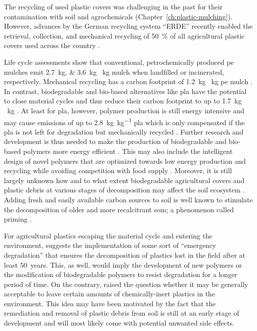 The recycling of used plastic covers was challenging in the past for their contamination with soil and agrochemicals (Chapter~\ref{ch:plastic-mulching}). However, advances by the German recycling system ``ERDE'' recently enabled the retrieval, collection, and mechanical recycling of \SI{50}{\percent} of all agricultural plastic covers used across the country \citep{BertlingKunststoffe2021,ERDERecyclingERDE2021}.

Life cycle assessments show that conventional, petrochemically produced \ac{pe} mulches emit \SIlist{2.7;3.6}{\kilo\gram}  \si{\per\kilo\gram} mulch when landfilled or incinerated, respectively. Mechanical recycling has a carbon footprint of \SI{1.2}{\kilo\gram}  \si{\per\kilo\gram} \ac{pe} mulch \citep{BosLife2008}. In contrast, biodegradable and bio-based alternatives like \ac{pla} have the potential to close material cycles and thus reduce their carbon footprint to up to \SI{1.7}{\kilo\gram}  \si{\per\kilo\gram} \citep{KollerSwitching2019,RezvaniGhomiLife2021}. At least for \ac{pla}, however, polymer production is still energy intensive and may cause  emissions of up to \SI{2.8}{\kilo\gram\per\kilo\gram} \ac{pla} which is only compensated if the \ac{pla} is not left for degradation but mechanically recycled \citep{RezvaniGhomiLife2021,AltmanMyth2021}. Further research and development is thus needed to make the production of biodegradable and bio-based polymers more energy efficient \citep{VieraAre2021}. This may also include the intelligent design of novel polymers that are optimized towards low energy production and recycling \citep{VieraAre2021,KorleyPolymer2021,KakadellisAchieving2021} while avoiding competition with food supply \citep{RhodesPlastic2018}. Moreover, it is still largely unknown how and to what extent biodegradable agricultural covers and plastic debris at various stages of decomposition may affect the soil ecosystem \citep{SanderBiodegradation2019,QinReview2021,AltmanMyth2021}. Adding fresh and easily available carbon sources to soil is well known to stimulate the decomposition of older and more recalcitrant \ac{som}; a phenomenon called priming \citep{ChenMixing2020}.

For agricultural plastics escaping the material cycle and entering the environment, \citet{BertlingKunststoffe2021} suggests the implementation of some sort of ``emergency degradation'' that ensures the decomposition of plastics lost in the field after at least 50~years. This, as well, would imply the development of new polymers or the modification of biodegradable polymers to resist degradation for a longer period of time. On the contrary, \citet{ScalengheResource2018} raised the question whether it may be generally acceptable to leave certain amounts of chemically-inert plastics in the environment. This idea may have been motivated by the fact that the remediation and removal of plastic debris from soil is still at an early stage of development \citep{PadervandRemoval2020} and will most likely come with potential unwanted side effects.

